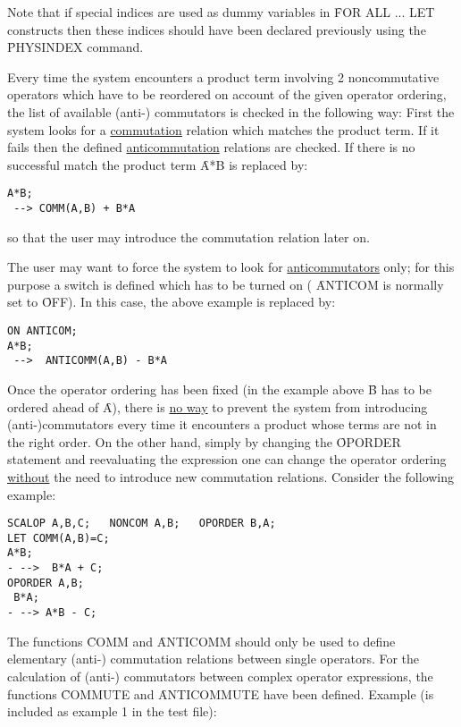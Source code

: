 Note that if special indices are used as dummy variables in
\f{FOR ALL ... LET} constructs then these indices should  have been
declared previously using the \f{PHYSINDEX} command.

Every time the system
encounters a product term involving 2
noncommutative operators which have to be reordered on account of the
given operator ordering, the list of available (anti-) commutators is
checked in the following way: First the system looks for a
\underline{commutation} relation which matches the  product term. If it
fails then the defined \underline{anticommutation} relations are
checked. If there is no successful match the product term
 \f{A*B} is replaced by: 

\begin{verbatim}
A*B;
 --> COMM(A,B) + B*A
\end{verbatim}
so that the user may introduce the commutation relation later on.

The user may want to force the system to look for
\underline{anticommutators} only; for this purpose a switch 
is defined which has to be turned on ( \f{ANTICOM} is normally set to
\f{OFF}). In this case, the above example is replaced by: 

\begin{verbatim}
ON ANTICOM;
A*B;
 -->  ANTICOMM(A,B) - B*A
\end{verbatim}

Once the operator ordering has been fixed (in the example above \f{B}
has to be ordered ahead of \f{A}),
there is \underline{no way} to prevent the
system from introducing (anti-)commutators  every time it encounters
a product whose terms are not in the right order. On the other hand,
simply by changing the \f{OPORDER} statement  and reevaluating the
expression one can change  the operator ordering
\underline{without}
the need to introduce new commutation relations.
Consider the following example: 

\begin{verbatim}
SCALOP A,B,C;   NONCOM A,B;   OPORDER B,A;
LET COMM(A,B)=C;
A*B;
- -->  B*A + C;
OPORDER A,B;
 B*A;
- --> A*B - C;
\end{verbatim}

The functions \f{COMM} and \f{ANTICOMM} should only be used  to
define
elementary (anti-) commutation relations between single operators.
For the calculation of (anti-) commutators between complex
operator
expressions, the functions \f{COMMUTE}  and
\f{ANTICOMMUTE}  have been defined.
Example (is included as example 1 in the test file): 


